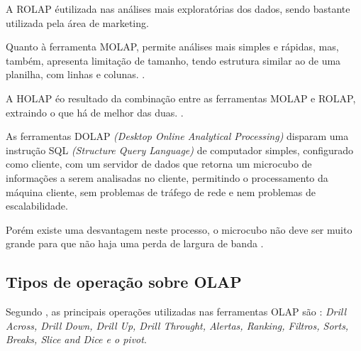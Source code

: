 A ROLAP \'{e}utilizada nas an\'{a}lises mais explorat\'{o}rias dos dados, sendo bastante utilizada pela \'{a}rea de marketing. 

Quanto \`{a} ferramenta MOLAP, permite an\'{a}lises mais simples e r\'{a}pidas, mas, tamb\'{e}m, apresenta limita\c{c}\~{a}o de tamanho, tendo estrutura similar ao de uma planilha, com linhas e colunas. \cite{olap-microsoft-2020}.

A HOLAP \'{e}o resultado da combina\c{c}\~{a}o entre as ferramentas MOLAP e ROLAP, extraindo o que h\'{a} de melhor das duas. \cite{olap-microsoft-2020}.

As ferramentas DOLAP \textit{(Desktop Online Analytical Processing)} disparam uma instru\c{c}\~{a}o
SQL \textit{(Structure Query Language)} de computador simples, configurado como cliente, com um servidor de dados que retorna um microcubo de informa\c{c}\~{o}es a serem analisadas no cliente, permitindo o processamento da m\'{a}quina cliente, sem problemas de tr\'{a}fego de rede e nem problemas de escalabilidade. 

Por\'{e}m existe uma desvantagem neste processo, o microcubo n\~{a}o deve ser muito grande para que n\~{a}o haja uma perda de largura de banda \cite{olap-microsoft-2020}.

\subsection{Tipos de opera\c{c}\~{a}o sobre OLAP}

Segundo \cite{olap-ballard-2006}, as principais opera\c{c}\~{o}es utilizadas nas ferramentas OLAP s\~{a}o : \textit{Drill Across, Drill Down, Drill Up, Drill Throught, Alertas, Ranking, Filtros, Sorts, Breaks, Slice and Dice e o pivot}.

